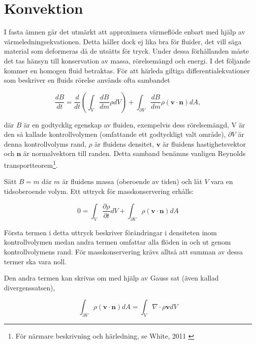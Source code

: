 \section{Konvektion}
\label{section:convection}
I fasta ämnen går det utmärkt att approximera värmeflöde enbart med hjälp av värmeledningsekvationen. Detta håller dock ej lika bra för fluider, det vill säga material som deformeras då de utsätts för tryck. Under dessa förhållanden måste det tas hänsyn till konservation av massa, rörelsemängd och energi. I det följande kommer en homogen fluid betraktas. För att härleda giltiga differentialekvationer som beskriver en fluids rörelse används ofta sambandet

\begin{equation}
\label{eq:convection:reynolds}
\frac{dB}{dt} = \frac{d}{dt}\left( \int_{V} \frac{dB}{dm} \rho dV \right) + \int_{\partial V} \frac{dB}{dm} \rho \left( \mathbf{v} \cdot \mathbf{n} \right)dA,
\end{equation}

där $B$ är en godtycklig egenskap av fluiden, exempelvis dess rörelsemängd, V är den så kallade kontrollvolymen (omfattande ett godtyckligt valt område), $\partial V$ är denna kontrollvolyms rand, $\rho$ är fluidens densitet, $\mathbf{v}$ är fluidens hastighetsvektor och $\mathbf{n}$ är normalvektorn till randen. Detta samband benämns vanligen Reynolds transportteorem\footnote{För närmare beskrivning och härledning, se White, 2011 \cite{white11}}.

Sätt $B = m$ där $m$ är fluidens massa (oberoende av tiden) och låt $V$ vara en tidsoberoende volym. Ett uttryck för masskonservering erhålls:

\begin{equation}
\label{eq:convection:masscon}
0 = \int_V \frac{\partial \rho}{\partial t} dV + \int_{\partial V} \rho \left( \mathbf{v} \cdot \mathbf{n} \right) dA
\end{equation}

Första termen i detta uttryck beskriver förändringar i densiteten inom kontrollvolymen medan andra termen omfattar alla flöden in och ut genom kontrollvolymens rand. För masskonservering krävs alltså att summan av dessa termer ska vara noll.

Den andra termen kan skrivas om med hjälp av Gauss sat (även kallad divergenssatsen),

\begin{equation}
\label{eq:convection:gauss}
\int_{\partial V} \rho \left( \mathbf{v} \cdot \mathbf{n} \right) dA = \int_V \nabla \cdot \rho \mathbf{v} dV
\end{equation}

